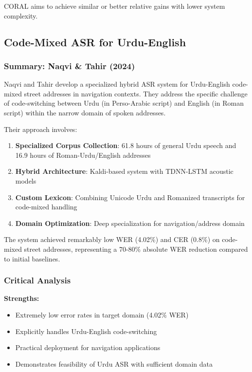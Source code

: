 CORAL aims to achieve similar or better relative gains with lower system complexity.

\subsection{Code-Mixed ASR for Urdu-English}

\subsubsection{Summary: Naqvi \& Tahir (2024)}

Naqvi and Tahir \cite{naqvi2024} develop a specialized hybrid ASR system for Urdu-English code-mixed street addresses in navigation contexts. They address the specific challenge of code-switching between Urdu (in Perso-Arabic script) and English (in Roman script) within the narrow domain of spoken addresses.

Their approach involves:

\begin{enumerate}[topsep=6pt,itemsep=3pt]
    \item \textbf{Specialized Corpus Collection}: 61.8 hours of general Urdu speech and 16.9 hours of Roman-Urdu/English addresses
    \item \textbf{Hybrid Architecture}: Kaldi-based system with TDNN-LSTM acoustic models
    \item \textbf{Custom Lexicon}: Combining Unicode Urdu and Romanized transcripts for code-mixed handling
    \item \textbf{Domain Optimization}: Deep specialization for navigation/address domain
\end{enumerate}

The system achieved remarkably low WER (4.02\%) and CER (0.8\%) on code-mixed street addresses, representing a 70-80\% absolute WER reduction compared to initial baselines.

\subsubsection{Critical Analysis}

\textbf{Strengths:}
\begin{itemize}[topsep=4pt,itemsep=2pt]
    \item Extremely low error rates in target domain (4.02\% WER)
    \item Explicitly handles Urdu-English code-switching
    \item Practical deployment for navigation applications
    \item Demonstrates feasibility of Urdu ASR with sufficient domain data
\end{itemize}

